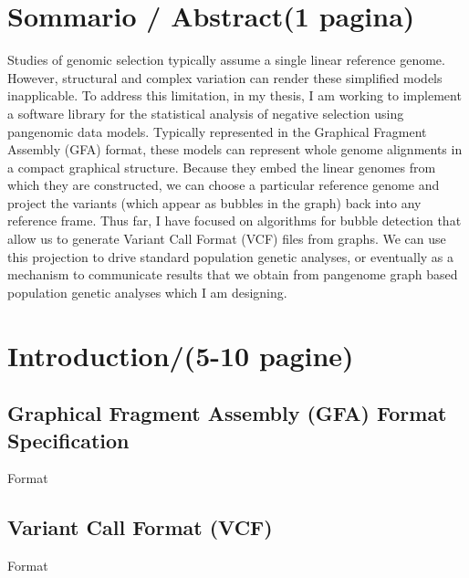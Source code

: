 \documentclass[
tikz,
11pt, %
oneside, %
english, %
singlespacing, %
headsepline, %
]{MastersDoctoralThesisV2} %
\begin{document}

\tableofcontents %




\chapter{Sommario / Abstract(1 pagina)}
 
Studies of genomic selection typically assume a single linear reference genome. However,
structural and complex variation can render these simplified models inapplicable. To address this
limitation, in my thesis, I am working to implement a software library for the statistical analysis of
negative selection using pangenomic data models. Typically represented in the Graphical Fragment
Assembly (GFA) format, these models can represent whole genome alignments in a compact
graphical structure. Because they embed the linear genomes from which they are constructed, we
can choose a particular reference genome and project the variants (which appear as bubbles in the
graph) back into any reference frame. Thus far, I have focused on algorithms for bubble detection
that allow us to generate Variant Call Format (VCF) files from graphs. We can use this projection to
drive standard population genetic analyses, or eventually as a mechanism to communicate results
that we obtain from pangenome graph based population genetic analyses which I am designing.

\chapter{Introduction/(5-10 pagine)}

\section {Graphical Fragment Assembly (GFA) Format Specification }
Format 
\section {Variant Call Format (VCF) }
Format
\end{document}

